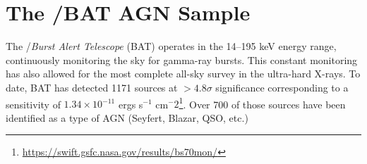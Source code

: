 \section{The \swift/BAT AGN Sample}\label{sample}
The  \swift/\textit{Burst Alert Telescope} (BAT) \citep{Barthelmy:2005ul,Gehrels:2004qf} operates in the 14--195 keV energy range, continuously monitoring the sky for gamma-ray bursts. This constant monitoring has also allowed for the most complete all-sky survey in the ultra-hard X-rays. To date, BAT has detected 1171 sources at  $>4.8\sigma$ significance corresponding to a sensitivity of $1.34\times10^{-11}$ ergs s$^{-1}$ cm${^-2}$\footnote{\url{https://swift.gsfc.nasa.gov/results/bs70mon/}}. Over 700 of those sources have been identified as a type of AGN (Seyfert, Blazar, QSO, etc.)
